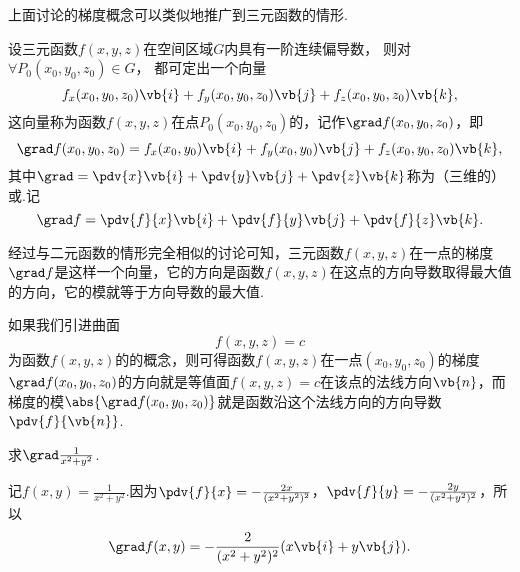 上面讨论的梯度概念可以类似地推广到三元函数的情形.
\begin{definition}
设三元函数\(f(x,y,z)\)在空间区域\(G\)内具有一阶连续偏导数，
则对\(\forall P_0(x_0,y_0,z_0) \in G\)，
都可定出一个向量\begin{equation*}
f_x(x_0,y_0,z_0) \vb{i} + f_y(x_0,y_0,z_0) \vb{j} + f_z(x_0,y_0,z_0) \vb{k},
\end{equation*}这向量称为函数\(f(x,y,z)\)在点\(P_0(x_0,y_0,z_0)\)的，记作\(\grad f(x_0,y_0,z_0)\)，即\begin{equation*}
\grad f(x_0,y_0,z_0)
= f_x(x_0,y_0) \vb{i} + f_y(x_0,y_0) \vb{j} + f_z(x_0,y_0,z_0) \vb{k},
\end{equation*}其中\(\grad = \pdv{x} \vb{i} + \pdv{y} \vb{j} + \pdv{z} \vb{k}\)称为（三维的）或.记\begin{equation*}
\grad f = \pdv{f}{x} \vb{i} + \pdv{f}{y} \vb{j} + \pdv{f}{z} \vb{k}.
\end{equation*}
\end{definition}

经过与二元函数的情形完全相似的讨论可知，三元函数\(f(x,y,z)\)在一点的梯度\(\grad f\)是这样一个向量，它的方向是函数\(f(x,y,z)\)在这点的方向导数取得最大值的方向，它的模就等于方向导数的最大值.

如果我们引进曲面\begin{equation*}
f(x,y,z) = c
\end{equation*}为函数\(f(x,y,z)\)的的概念，则可得函数\(f(x,y,z)\)在一点\((x_0,y_0,z_0)\)的梯度\(\grad f(x_0,y_0,z_0)\)的方向就是等值面\(f(x,y,z) = c\)在该点的法线方向\(\vb{n}\)，而梯度的模\(\abs{\grad f(x_0,y_0,z_0)}\)就是函数沿这个法线方向的方向导数\(\pdv{f}{\vb{n}}\).

\begin{example}
求\(\grad \frac{1}{x^2+y^2}\).
\begin{solution}
记\(f(x,y) = \frac{1}{x^2+y^2}\).因为\(\pdv{f}{x} = -\frac{2x}{(x^2+y^2)^2}\)，\(\pdv{f}{y} = -\frac{2y}{(x^2+y^2)^2}\)，所以\begin{equation*}
\grad f(x,y) = -\frac{2}{(x^2+y^2)^2} (x \vb{i} + y \vb{j}).
\end{equation*}
\end{solution}
\end{example}

